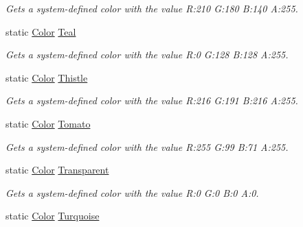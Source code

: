 \begin{DoxyCompactItemize}
\begin{DoxyCompactList}\small\item\em Gets a system-\/defined color with the value R\+:210 G\+:180 B\+:140 A\+:255.\end{DoxyCompactList}\item 
static \hyperlink{structMicrosoft_1_1Xna_1_1Framework_1_1Color}{Color} \hyperlink{structMicrosoft_1_1Xna_1_1Framework_1_1Color_a9656144912b60001f94a6b7ddfa99b3f}{Teal}
\begin{DoxyCompactList}\small\item\em Gets a system-\/defined color with the value R\+:0 G\+:128 B\+:128 A\+:255.\end{DoxyCompactList}\item 
static \hyperlink{structMicrosoft_1_1Xna_1_1Framework_1_1Color}{Color} \hyperlink{structMicrosoft_1_1Xna_1_1Framework_1_1Color_afeba7da96a1ce1728a5a82ea2f3048b0}{Thistle}
\begin{DoxyCompactList}\small\item\em Gets a system-\/defined color with the value R\+:216 G\+:191 B\+:216 A\+:255.\end{DoxyCompactList}\item 
static \hyperlink{structMicrosoft_1_1Xna_1_1Framework_1_1Color}{Color} \hyperlink{structMicrosoft_1_1Xna_1_1Framework_1_1Color_ae54db898acfaad8489704b5c3cb9df05}{Tomato}
\begin{DoxyCompactList}\small\item\em Gets a system-\/defined color with the value R\+:255 G\+:99 B\+:71 A\+:255.\end{DoxyCompactList}\item 
static \hyperlink{structMicrosoft_1_1Xna_1_1Framework_1_1Color}{Color} \hyperlink{structMicrosoft_1_1Xna_1_1Framework_1_1Color_a931d4f2dd78c6c26a3f6e02ba2cee7a0}{Transparent}
\begin{DoxyCompactList}\small\item\em Gets a system-\/defined color with the value R\+:0 G\+:0 B\+:0 A\+:0.\end{DoxyCompactList}\item 
static \hyperlink{structMicrosoft_1_1Xna_1_1Framework_1_1Color}{Color} \hyperlink{structMicrosoft_1_1Xna_1_1Framework_1_1Color_a5e34586bde96349194d4378740ef6652}{Turquoise}

\end{DoxyCompactItemize}
